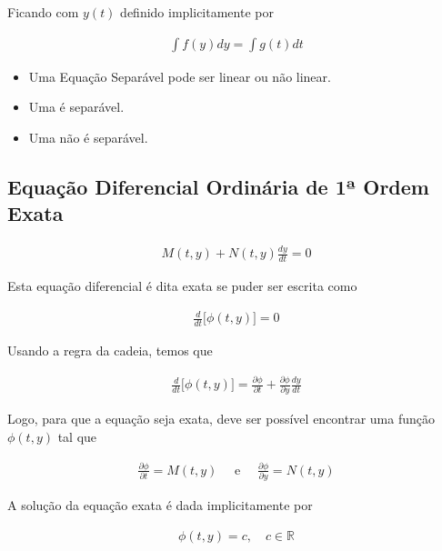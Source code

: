 \documentclass{article}
\begin{document}
Ficando com $y(t)$ definido implicitamente por

\begin{gather*}
\boxed{\int f(y) dy = \int g(t) dt}
\end{gather*}

\smallskip

\begin{itemize}
    \item Uma Equação Separável pode ser linear ou não linear.
    \item Uma  é separável.
    \item Uma  não é separável.
\end{itemize}

\bigskip

\subsection{Equação Diferencial Ordinária de 1ª Ordem Exata}
\label{subsec: edo-ordem1-exata}

\begin{gather*}
\boxed{M(t,y) + N(t,y) \frac{dy}{dt} = 0}
\end{gather*}

Esta equação diferencial é dita exata se puder ser escrita como

\begin{gather*}
\frac{d}{dt} \Big[ \phi(t,y) \Big] = 0
\end{gather*}

Usando a regra da cadeia, temos que

\begin{gather*}
\frac{d}{dt} \Big[ \phi(t,y) \Big] = \frac{\partial \phi}{\partial t} + \frac{\partial \phi}{\partial y} \frac{dy}{dt}
\end{gather*}

Logo, para que a equação seja exata, deve ser possível encontrar uma função $\phi(t,y)$ tal que

\begin{gather*}
\frac{\partial \phi}{\partial t} = M(t,y) \quad \text{ e } \quad \frac{\partial \phi}{\partial y} = N(t,y)
\end{gather*}

A solução da equação exata é dada implicitamente por

\begin{gather*}
\boxed{\phi(t,y) = c, \quad c \in \mathbb{R}}
\end{gather*}
\end{document}
